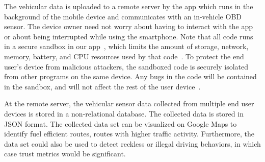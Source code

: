 The vehicular data is uploaded to a remote server by the app
which runs in the background of the mobile device and communicates
with an in-vehicle OBD sensor. The device owner need not worry about having to
interact with the app or about being interrupted while using the smartphone. 
Note that all code runs in a secure sandbox in our 
app~\cite{sensor-app}, which limits the amount of storage, network, 
memory, battery, and CPU resources used by that code~\cite{Cappos_CCS_10}. 
To protect the end user's device from malicious attackers, the sandboxed 
code is securely isolated from other programs on the same device.
Any bugs in the code will be contained in the sandbox, and will not 
affect the rest of the user device~\cite{Cappos_CCS_10}. 
%

At the remote server, the vehicular sensor data collected from 
multiple end user devices is stored in a non-relational database. 
The collected data is stored in JSON format.
The collected data set can be visualized on Google Maps to 
identify fuel efficient routes, routes with higher traffic activity.
Furthermore, the data set could also be used to detect reckless or illegal driving behaviors,
in which case trust metrics would be significant.



